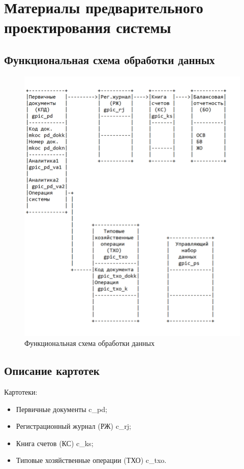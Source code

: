 \section{Материалы предварительного проектирования системы}
\subsection{Функциональная схема обработки данных}

\begin{figure}[!htb]
    \centering
    \includegraphics[width=15cm]
        {_assets/gpic_part2.png}
    \caption{Функциональная схема обработки данных}
\end{figure}

\subsection{Описание картотек}

Картотеки:

\begin{itemize}
    \item Первичные документы \gpiFIO\/c\_pd;
    \item Регистрационный журнал (РЖ) \gpiFIO\/c\_rj;
    \item Книга счетов (КС) \gpiFIO\/c\_ks;
    \item Типовые хозяйственные операции (ТХО) \gpiFIO\/c\_txo.
\end{itemize}

